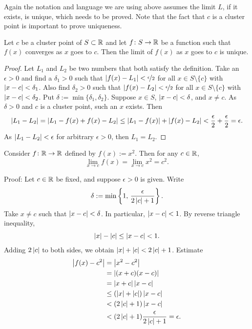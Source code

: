 Again the notation and language we are using above assumes the limit $L$, if
it exists, is unique, which needs to be proved.  Note that the fact that $c$
is a cluster point is important to prove uniqueness.

\begin{prop}
Let $c$ be a cluster point of $S \subset {\mathbb{R}}$ and let $f \colon S \to {\mathbb{R}}$
be a function such that $f(x)$ converges as $x$ goes to $c$.  Then
the limit of $f(x)$ as $x$ goes to $c$ is unique.
\end{prop}

\begin{proof}
Let $L_1$ and $L_2$ be two numbers that both satisfy the definition.
Take an $\epsilon > 0$ and find a $\delta_1 > 0$ such that
$\left\lvert {f(x)-L_1} \right\rvert < \nicefrac{\epsilon}{2}$ 
for all $x \in S \setminus \{c\}$ with $\left\lvert {x-c} \right\rvert < \delta_1$.
Also find $\delta_2 > 0$ such that
$\left\lvert {f(x)-L_2} \right\rvert < \nicefrac{\epsilon}{2}$
for all $x \in S \setminus \{c\}$ with $\left\lvert {x-c} \right\rvert < \delta_2$.
Put $\delta := \min \{ \delta_1, \delta_2 \}$.  Suppose $x \in S$,
$\left\lvert {x-c} \right\rvert < \delta$, and $x \not= c$.  As $\delta > 0$ and $c$ is a cluster
point, such an $x$ exists.  Then
\begin{equation*}
\left\lvert {L_1 - L_2} \right\rvert =
\left\lvert {L_1 - f(x) + f(x) - L_2} \right\rvert \leq
\left\lvert {L_1 - f(x)} \right\rvert + \left\lvert {f(x) - L_2} \right\rvert < \frac{\epsilon}{2} + \frac{\epsilon}{2}
= \epsilon.
\end{equation*}
As $\left\lvert {L_1-L_2} \right\rvert < \epsilon$ for arbitrary $\epsilon > 0$, then
$L_1 = L_2$.
\end{proof}

\begin{example}
Consider $f \colon {\mathbb{R}} \to {\mathbb{R}}$ defined by $f(x) := x^2$.  Then
for any $c \in {\mathbb{R}}$,
\begin{equation*}
\lim_{x\to c} f(x) = \lim_{x\to c} x^2 = c^2 .
\end{equation*}

Proof: Let $c \in {\mathbb{R}}$ be fixed, and suppose $\epsilon > 0$ is given.  Write
\begin{equation*}
\delta := \min \left\{ 1 , \, \frac{\epsilon}{2\left\lvert {c} \right\rvert+1} \right\} .
\end{equation*}
Take $x \not= c$ such that $\left\lvert {x-c} \right\rvert < \delta$.  In particular,
$\left\lvert {x-c} \right\rvert < 1$.  By reverse triangle inequality,
\begin{equation*}
\left\lvert {x} \right\rvert-\left\lvert {c} \right\rvert \leq \left\lvert {x-c} \right\rvert < 1 .
\end{equation*}
Adding $2\left\lvert {c} \right\rvert$ to both sides, we obtain
$\left\lvert {x} \right\rvert + \left\lvert {c} \right\rvert < 2\left\lvert {c} \right\rvert + 1$.  Estimate
\begin{equation*}
\begin{split}
\left\lvert {f(x) - c^2} \right\rvert &= \left\lvert {x^2-c^2} \right\rvert \\
&= \left\lvert {(x+c)(x-c)} \right\rvert \\
&= \left\lvert {x+c} \right\rvert\left\lvert {x-c} \right\rvert \\
&\leq (\left\lvert {x} \right\rvert+\left\lvert {c} \right\rvert)\left\lvert {x-c} \right\rvert \\
&< (2\left\lvert {c} \right\rvert+1)\left\lvert {x-c} \right\rvert \\
&< (2\left\lvert {c} \right\rvert+1)\frac{\epsilon}{2\left\lvert {c} \right\rvert+1} = \epsilon .
\end{split}
\end{equation*}
\end{example}

